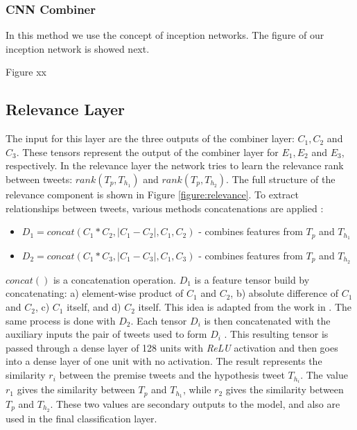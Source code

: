 \documentclass[12pt]{report}
\begin{document}
  
\subsubsection{\ac{CNN} Combiner}

In this method we use the concept of inception networks. The figure of our inception network is showed next.

Figure xx


\subsection{Relevance Layer}

The input for this layer are the three outputs of the combiner layer: $C_1, C_2$ and $C_3$. These tensors represent 
the output of the combiner layer for $E_1, E_2$ and $E_3$, respectively.  In the relevance layer the network tries to learn the relevance rank between tweets: 
$rank(T_p, T_{h_1})$ and $rank(T_p, T_{h_2})$.  The full structure of the relevance component is shown in Figure \ref{figure:relevance}.
To extract relationships between tweets, various methods concatenations are applied : 

\begin{itemize}
	\item $D_1 = concat(C_1*C_2, |C_1 - C_2|, C_1, C_2)$  - combines features from $T_p$ and $T_{h_1}$
	\item $D_2 = concat(C_1*C_3, |C_1 - C_3|, C_1, C_3)$  - combines features from $T_p$ and $T_{h_2}$
\end{itemize}
$concat()$ is a concatenation operation. 
$D_1$ is  a feature tensor build by concatenating: a) element-wise product of $C_1$ and $C_2$, b) absolute difference of $C_1$ and $C_2$, c) $C_1$ itself, 
and d) $C_2$ itself. This idea is adapted from the work in \cite{Conneau2017}. 
The same process is done with $D_2$. 
Each  tensor $D_i$ is then concatenated with the auxiliary inputs the pair of tweets used to form $D_i$ . This resulting tensor is passed through  a dense layer of 128 units with {\em ReLU} activation and then goes into a dense layer of one unit with no activation. The result represents the similarity  $r_i$ between the premise  tweets  and the hypothesis tweet $T_{h_i}$.  The value $r_1$ gives the similarity between  $T_p$ and $T_{h_1}$, while $r_2$ gives the similarity between  $T_p$ and $T_{h_2}$.
These two values are secondary outputs to the model, and also are used in the final classification layer. 
\end{document}
